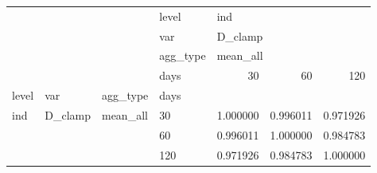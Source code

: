 \begin{tabular}{llllrrr}
\toprule
    &         &          & level & \multicolumn{3}{l}{ind} \\
    &         &          & var & \multicolumn{3}{l}{D\_clamp} \\
    &         &          & agg\_type & \multicolumn{3}{l}{mean\_all} \\
    &         &          & days &       30  &       60  &       120 \\
level & var & agg\_type & days &           &           &           \\
\midrule
ind & D\_clamp & mean\_all & 30  &  1.000000 &  0.996011 &  0.971926 \\
    &         &          & 60  &  0.996011 &  1.000000 &  0.984783 \\
    &         &          & 120 &  0.971926 &  0.984783 &  1.000000 \\
\bottomrule
\end{tabular}
